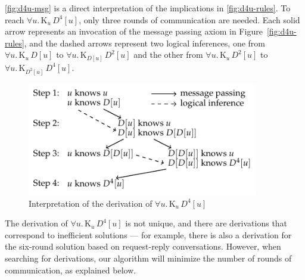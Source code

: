 \documentclass{sokendai_thesis} %
\newcommand{\knows}[2]{\mathrm K_{#1}\,{#2}}
\begin{document}
\autoref{fig:d4u-msg} is a direct interpretation of the implications in \autoref{fig:d4u-rules}.
To reach $\forall u.\,\knows{u}{D^4[u]}$, only three rounds of communication are needed.
Each solid arrow represents an invocation of the message passing axiom in Figure~\ref{fig:d4u-rules}, and the dashed arrows represent two logical inferences, one from $\forall u.\,\knows{u}{D[u]}$ to $\forall u.\,\knows{D[u]}{D^2[u]}$ and the other from $\forall u.\,\knows{u}{D^2[u]}$ to $\forall u.\,\knows{D^2[u]}{D^4[u]}$.

\begin{figure}[t]
 \centering
 \includegraphics[width=0.9\textwidth]{figures/d4u.pdf}
 \vspace{-2ex}
 \caption{Interpretation of the derivation of $\forall u.\,\knows{u}{D^4[u]}$}
 \label{fig:d4u-msg}
\end{figure}

The derivation of $\forall u.\,\knows{u}{D^4[u]}$ is not unique, and there are derivations that correspond to inefficient solutions --- for example, there is also a derivation for the six-round solution based on request-reply conversations.
However, when searching for derivations, our algorithm will minimize the number of rounds of communication, as explained below.
\end{document}

